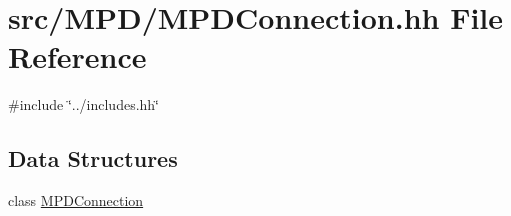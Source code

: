 \hypertarget{MPDConnection_8hh}{
\section{src/\-M\-P\-D/\-M\-P\-D\-Connection.hh \-File \-Reference}
\label{MPDConnection_8hh}
}
{\ttfamily \#include \char`\"{}../includes.\-hh\char`\"{}}\*
\subsection*{\-Data \-Structures}
\begin{DoxyCompactItemize}
\item 
class \hyperlink{classMPDConnection}{\-M\-P\-D\-Connection}
\end{DoxyCompactItemize}
